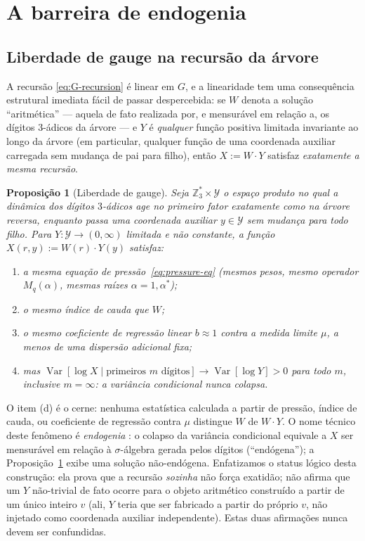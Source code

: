 \documentclass[11pt]{article}
\newtheorem{proposition}[theorem]{Proposição}
\theoremstyle{definition}
\theoremstyle{remark}
\DeclareMathOperator{\Var}{Var}
\begin{document}
\section{A barreira de endogenia}
\label{sec:endogeny}

\subsection{Liberdade de gauge na recursão da árvore}

A recursão \eqref{eq:G-recursion} é linear em $G$, e a linearidade tem
uma consequência estrutural imediata fácil de passar despercebida: se
$W$ denota a solução ``aritmética'' --- aquela de fato realizada por,
e mensurável em relação a, os dígitos $3$-ádicos da árvore --- e $Y$ é
\emph{qualquer} função positiva limitada invariante ao longo da árvore
(em particular, qualquer função de uma coordenada auxiliar carregada
sem mudança de pai para filho), então $X := W\cdot Y$ satisfaz
\emph{exatamente a mesma recursão}.

\begin{proposition}[Liberdade de gauge]\label{prop:gauge}
Seja $\mathbb{Z}_3^\ast\times\mathcal{Y}$ o espaço produto no qual a
dinâmica dos dígitos $3$-ádicos age no primeiro fator exatamente como
na árvore reversa, enquanto passa uma coordenada auxiliar
$y\in\mathcal{Y}$ sem mudança para todo filho. Para $Y:\mathcal{Y}\to
(0,\infty)$ limitada e não constante, a função $X(r,y):=W(r)\cdot Y(y)$
satisfaz:
\begin{enumerate}[label=(\alph*)]
\item a mesma equação de pressão~\eqref{eq:pressure-eq} (mesmos pesos,
  mesmo operador $M_q(\alpha)$, mesmas raízes $\alpha=1,\alpha^\ast$);
\item o mesmo índice de cauda que $W$;
\item o mesmo coeficiente de regressão linear $b\approx 1$ contra a
  medida limite $\mu$, a menos de uma dispersão adicional fixa;
\item mas $\Var[\log X \mid \text{primeiros } m \text{ dígitos}] \to
  \Var[\log Y] > 0$ para \emph{todo} $m$, inclusive $m=\infty$: a
  variância condicional nunca colapsa.
\end{enumerate}
\end{proposition}

O item (d) é o cerne: nenhuma estatística calculada a partir de
pressão, índice de cauda, ou coeficiente de regressão contra $\mu$
distingue $W$ de $W\cdot Y$. O nome técnico deste fenômeno é
\emph{endogenia} \cite{AldousBandyopadhyay2005}: o colapso da
variância condicional equivale a $X$ ser mensurável em relação à
$\sigma$-álgebra gerada pelos dígitos (``endógena''); a
Proposição~\ref{prop:gauge} exibe uma solução não-endógena.
Enfatizamos o status lógico desta construção: ela prova que a recursão
\emph{sozinha} não força exatidão; não afirma que um $Y$ não-trivial
de fato ocorre para o objeto aritmético construído a partir de um
único inteiro $v$ (ali, $Y$ teria que ser fabricado a partir do
próprio $v$, não injetado como coordenada auxiliar independente). Estas
duas afirmações nunca devem ser confundidas.
\end{document}
